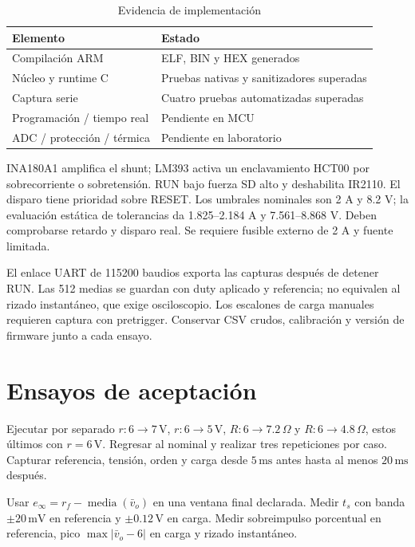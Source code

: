 \documentclass[conference,letterpaper]{IEEEtran}
\begin{document}
\begin{table}[H]\caption{Evidencia de implementación}\label{tab:implementation}\centering\footnotesize\setlength{\tabcolsep}{2pt}\renewcommand{\arraystretch}{1.18}\begin{tabularx}{\columnwidth}{LY}\toprule
Elemento & Estado\\\midrule
Compilación ARM & ELF, BIN y HEX generados\\
Núcleo y runtime C & Pruebas nativas y sanitizadores superadas\\
Captura serie & Cuatro pruebas automatizadas superadas\\
Programación / tiempo real & Pendiente en MCU\\
ADC / protección / térmica & Pendiente en laboratorio\\\bottomrule\end{tabularx}\end{table}
INA180A1 amplifica el shunt; LM393 activa un enclavamiento HCT00 por sobrecorriente o sobretensión. RUN bajo fuerza SD alto y deshabilita IR2110. El disparo tiene prioridad sobre RESET. Los umbrales nominales son 2 A y 8.2 V; la evaluación estática de tolerancias da 1.825--2.184 A y 7.561--8.868 V. Deben comprobarse retardo y disparo real. Se requiere fusible externo de 2 A y fuente limitada.

El enlace UART de 115200 baudios exporta las capturas después de detener RUN. Las 512 medias se guardan con duty aplicado y referencia; no equivalen al rizado instantáneo, que exige osciloscopio. Los escalones de carga manuales requieren captura con pretrigger. Conservar CSV crudos, calibración y versión de firmware junto a cada ensayo.

\section{Ensayos de aceptación}
Ejecutar por separado $r:6\to7\,\mathrm{V}$, $r:6\to5\,\mathrm{V}$, $R:6\to7.2\,\Omega$ y $R:6\to4.8\,\Omega$, estos últimos con $r=6\,\mathrm{V}$. Regresar al nominal y realizar tres repeticiones por caso. Capturar referencia, tensión, orden y carga desde $5\,\mathrm{ms}$ antes hasta al menos $20\,\mathrm{ms}$ después.

Usar $e_\infty=r_f-\operatorname{media}(\bar v_o)$ en una ventana final declarada. Medir $t_s$ con banda $\pm20\,\mathrm{mV}$ en referencia y $\pm0.12\,\mathrm{V}$ en carga. Medir sobreimpulso porcentual en referencia, pico $\max|\bar v_o-6|$ en carga y rizado instantáneo.
\end{document}
